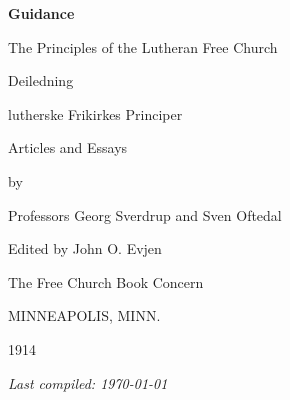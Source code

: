 \documentclass[12pt]{article}
\begin{document}
\begin{titlepage}
    \centering
    \vspace*{1.5in}

    {\LARGE\bfseries Guidance\par}
    {\LARGE The Principles of the Lutheran Free Church\par}
    \vspace{0.15in}

    {\large Deiledning \par}
	  {\large lutherske Frikirkes Principer\par}
    \vspace{0.35in}



    {\large Articles and Essays\par}

    \vspace{0.75in}

    {\large by\par}
    \vspace{0.10in}

    {\large Professors Georg Sverdrup and Sven Oftedal\par}

    \vspace{0.50in}

    {\large Edited by John O. Evjen\par}

    \vfill

    {\small The Free Church Book Concern\par}
    {\small MINNEAPOLIS, MINN.\par}
    {\small 1914\par}

    \vspace{0.5in}
	
	\noindent\textit{Last compiled: \today}

\end{titlepage}

\tableofcontents
\newpage


\pagebreak
%

\end{document}
